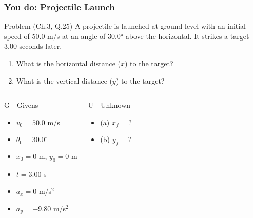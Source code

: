 \documentclass{beamer}
\begin{document}
\begin{frame}
\frametitle{You do: Projectile Launch}
\begin{block}{Problem (Ch.3, Q.25)}
A projectile is launched at ground level with an initial speed of 50.0 m/s at an angle of 30.0° above the horizontal. It strikes a target 3.00 seconds later.
\begin{enumerate}
    \item What is the horizontal distance ($x$) to the target?
    \item What is the vertical distance ($y$) to the target?
\end{enumerate}
\end{block}
\pause
\begin{columns}[T]
\begin{block}{G - Givens}
\begin{itemize}
\item $v_0 = 50.0$ m/s
\item $\theta_0 = 30.0^\circ$
\item $x_0 = 0$ m, $y_0 = 0$ m
\item $t = 3.00$ s
\item $a_x = 0$ m/s$^2$
\item $a_y = -9.80$ m/s$^2$
\end{itemize}
\end{block}
\pause
{}
\begin{block}{U - Unknown}
\begin{itemize}
\item (a) $x_f = ?$
\item (b) $y_f = ?$
\end{itemize}
\end{block}
\end{columns}
\end{frame}
\end{document}
